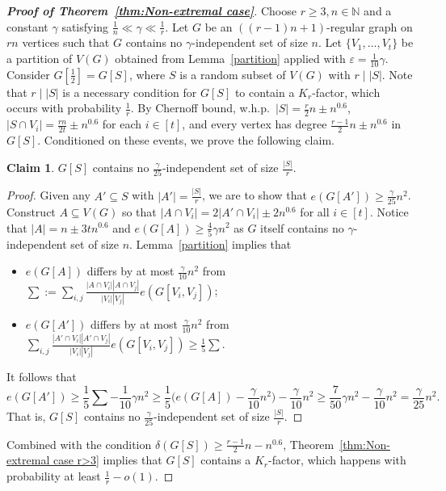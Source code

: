 \documentclass[11pt, a4paper]{article}
\theoremstyle{definition}
\newtheorem{claim}[theorem]{Claim}
\newcommand{\eps}{\varepsilon}
\newcommand{\<}{\subseteq}
\newcommand{\de}{\delta}
\begin{document}
\begin{proof}[{\bf Proof of Theorem~\ref{thm:Non-extremal case}}]
Choose $r\geq 3,n\in \mathbb{N}$ and a constant $\gamma$ satisfying $\frac{1}{n}\ll\gamma\ll \frac{1}{r}$. Let $G$ be an $((r-1)n+1)$-regular graph on $rn$ vertices such that $G$ contains no $\gamma$-independent set of size $n$. Let $\{V_1,\ldots,V_t\}$ be a partition of $V(G)$ obtained from Lemma~\ref{partition} applied with $\eps=\frac{1}{10}\gamma$. Consider $G[\frac{1}{2}]=G[S]$, where $S$ is a random subset of $V(G)$ with $r\mid |S|$. Note that $r \mid |S|$ is a necessary condition for $G[S]$ to contain a $K_r$-factor, which occurs with probability $\frac{1}{r}$. By Chernoff bound, {w.h.p.}~$|S|=\frac{r}{2}n\pm n^{0.6}$, $|S\cap V_i|= \frac{rn}{2t}\pm n^{0.6}$ for each $i\in [t]$,  and every vertex has degree $\frac{r-1}{2}n\pm n^{0.6}$ in $G[S]$. 
Conditioned on these events,  we prove the following claim. 
\begin{claim}\label{no-independent}
    $G[S]$ contains no $\frac{\gamma}{25}$-independent set of size $\frac{|S|}{r}$. 
\end{claim}

\begin{proof}
Given any $A'\subseteq S$ with $|A'|= \frac{|S|}{r}$, we are to show that $e(G[A'])\ge \frac{\gamma}{25} n^2$. 
Construct $A\subseteq V(G)$ %
so that {$|A\cap V_i|=2|A'\cap V_i|\pm 2n^{0.6}$} for all $i\in [t]$. Notice that $|A|=n\pm 3tn^{0.6}$ and $e(G[A])\geq \frac{4}{5}\gamma n^2$ as $G$ itself contains no $\gamma$-independent set of size $n$. Lemma~\ref{partition} implies that
\begin{itemize}
    \item $e(G[A])$ differs by at most $\frac{\gamma}{10}n^2$ from $\sum:=\sum_{i,j}\frac{|A\cap V_i||A\cap V_j|}{|V_i||V_j|}e(G[V_i,V_j])$;
    \item $e(G[A'])$ differs by at most $\frac{\gamma}{10}n^2$ from $\sum_{i,j}\frac{|A'\cap V_i||A'\cap V_j|}{|V_i||V_j|}e(G[V_i,V_j])\geq {\frac{1}{5}}\sum$. %
\end{itemize}
{{It follows that 
$$
e(G[A'])\geq \frac{1}{5}\sum-\frac{1}{10}\gamma n^2\geq \frac{1}{5}\Big(e(G[A])-\frac{\gamma}{10} n^2\Big)-\frac{\gamma}{10}n^2\geq \frac{7}{50}\gamma n^2-\frac{\gamma}{10} n^2= \frac{\gamma}{25}n^2. 
$$}} %
That is, $G[S]$ contains no $\frac{\gamma}{25}$-independent set of size $\frac{|S|}{r}$. 
\end{proof}
Combined with the condition $\de(G[S])\geq \frac{r-1}{2}n- n^{0.6}$, Theorem~\ref{thm:Non-extremal case r>3} implies that $G[S]$ contains a $K_r$-factor, which happens with probability at least $\frac{1}{r}-o(1)$. 
\end{proof}
\end{document}
